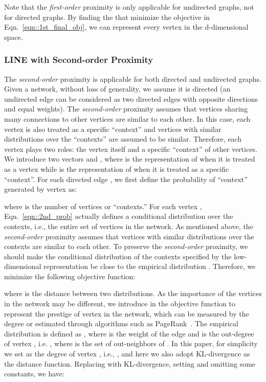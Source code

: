 \documentclass{sig-alternate-2013}
\begin{document}
Note that the \emph{first-order} proximity is only applicable for undirected graphs, not for directed graphs. By finding the  that minimize the objective in Eqn.~\eqref{eqn::1st_final_obj}, we can represent every vertex in the d-dimensional space. 

\subsubsection{LINE with Second-order Proximity}

The \emph{second-order} proximity is applicable for both directed and undirected graphs. Given a network, without loss of generality, we assume it is directed (an undirected edge can be considered as two directed edges with opposite directions and equal weights). The \emph{second-order} proximity assumes that vertices sharing many connections to other vertices are similar to each other. In this case, each vertex is also treated as a specific ``context'' and vertices with similar distributions over the ``contexts'' are assumed to be similar.  Therefore, each vertex plays two roles: the vertex itself and a specific ``context'' of other vertices. We introduce two vectors  and , where  is the representation of  when it is treated as a vertex while  is the representation of  when it is treated as a specific ``context''.  For each directed edge , we first define the probability of ``context''  generated by vertex  as:

where  is the number of vertices or ``contexts.'' For each vertex , Eqn.~\eqref{eqn::2nd_prob} actually defines a conditional distribution  over the contexts, i.e., the entire set of vertices in the network. As mentioned above, the \emph{second-order} proximity assumes that vertices with similar distributions over the contexts are similar to each other. To preserve the \emph{second-order} proximity, we should make the conditional distribution of the contexts   specified by the low-dimensional representation be close to the empirical distribution . Therefore, we minimize the following objective function:

where  is the distance between two distributions. As the importance of the vertices in the network may be different, we introduce  in the objective function to represent the prestige of vertex  in the network, which can be measured by the degree or estimated through algorithms such as PageRank~\cite{page1999pagerank}. The empirical distribution  is defined as , where  is the weight of the edge  and  is the out-degree of vertex , i.e. , where  is the set of out-neighbors of . In this paper, for simplicity we set  as the degree of vertex , i.e., , and here we also adopt KL-divergence as the distance function. Replacing  with KL-divergence, setting  and omitting some constants, we have: 
\end{document}
